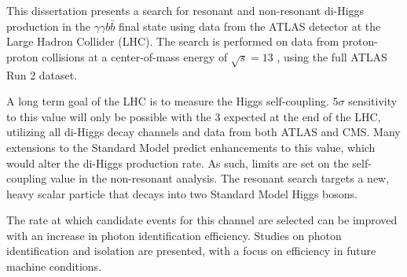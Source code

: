 This dissertation presents a search for resonant and non-resonant di-Higgs production in the $\gamma \gamma b \bar{b}$ final state using data from the ATLAS detector at the Large Hadron Collider (LHC).  The search is performed on data from proton-proton collisions at a center-of-mass energy of $\sqrt{s} = 13$ \TeV, using the full ATLAS Run 2 dataset. 

A long term goal of the LHC is to measure the Higgs self-coupling. 5$\sigma$ sensitivity to this value will only be possible with the 3 \invab expected at the end of the LHC, utilizing all di-Higgs decay channels and data from both ATLAS and CMS. Many extensions to the Standard Model predict enhancements to this value, which would alter the di-Higgs production rate. As such, limits are set on the self-coupling value in the non-resonant analysis. The resonant search targets a new, heavy scalar particle that decays into two Standard Model Higgs bosons.

The rate at which candidate events for this channel are selected can be improved with an increase in photon identification efficiency. Studies on photon identification and isolation are presented, with a focus on efficiency in future machine conditions. 

